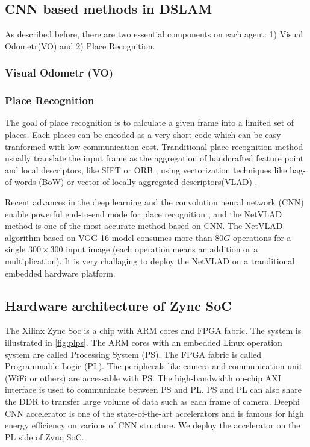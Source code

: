 \label{sec:background}
\subsection{CNN based methods in DSLAM}
As described before, there are two essential components on each agent: 1) Visual Odometr(VO) and 2) Place Recognition.

\subsubsection{Visual Odometr (VO)}

\subsubsection{Place Recognition}

The goal of place recognition is to calculate a given frame into a limited set of places. Each places can be encoded as a very short code which can be easy tranformed with low communication cost. Tranditional place recognition method usually translate the input frame as the aggregation of handcrafted feature point and local descriptors, like SIFT \cite{Lowe:2004e6e} or ORB \cite{Mur-Artal:2017281}, using vectorization techniques like bag-of-words (BoW) \cite{Galvez-Lopez:2012c94} or vector of locally aggregated descriptors(VLAD) \cite{Jegou:2010f45}.

Recent advances in the deep learning and the convolution neural network (CNN) enable powerful end-to-end mode for place recognition \cite{Noh:2017d0b,Arandjelovic:2017997}, and the NetVLAD method is one of the most accurate method based on CNN. The NetVLAD algorithm based on VGG-16 model \cite{Simonyan:20143be} consumes more than $80G$ operations for a single $300 \times 300$ input image (each operation means an addition or a multiplication). It is very challaging to deploy the NetVLAD on a tranditional embedded hardware platform.

\subsection{Hardware architecture of Zync SoC}
The Xilinx Zync Soc is a chip with ARM cores and FPGA fabric. The system is illustrated in \cref{fig:plps}. The ARM cores with an embedded Linux operation system are called Processing System (PS). The FPGA fabric is called Programmable Logic (PL). The peripherals like camera and communication unit (WiFi or others) are accessable with PS. The high-bandwidth on-chip AXI interface is used to communicate between PS and PL. PS and PL can also share the DDR to transfer large volume of data such as each frame of camera.
Deephi CNN accelerator \cite{Tech:2019360} is one of the state-of-the-art accelerators and is famous for high energy efficiency on various of CNN structure. We deploy the accelerator on the PL side of Zynq SoC.

